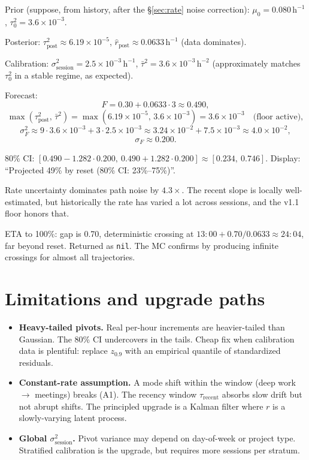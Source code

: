 \documentclass[11pt]{article}
\newcommand{\rpost}{\hat r_{\text{post}}}
\newcommand{\taupostsq}{\tau_{\text{post}}^2}
\newcommand{\tauzerosq}{\tau_0^2}
\newcommand{\sigsessionsq}{\sigma_{\text{session}}^2}
\newcommand{\taurecent}{\tau_{\text{recent}}}
\begin{document}
Prior (suppose, from history, after the \S\ref{sec:rate} noise correction):
$\mu_0 = 0.080\,\mathrm{h}^{-1}$, $\tauzerosq = 3.6 \times 10^{-3}$.

Posterior: $\taupostsq \approx 6.19 \times 10^{-5}$, $\rpost \approx
0.0633\,\mathrm{h}^{-1}$ (data dominates).

Calibration: $\sigsessionsq = 2.5 \times 10^{-3}\,\mathrm{h}^{-1}$, $\bar\tau^2
= 3.6 \times 10^{-3}\,\mathrm{h}^{-2}$ (approximately matches $\tauzerosq$ in a
stable regime, as expected).

Forecast:
\[
  F = 0.30 + 0.0633 \cdot 3 \approx 0.490,
\]
\[
  \max(\taupostsq,\, \bar\tau^2) = \max(6.19 \times 10^{-5},\, 3.6 \times 10^{-3})
    = 3.6 \times 10^{-3} \quad \text{(floor active)},
\]
\[
  \sigma_F^2 \approx 9 \cdot 3.6 \times 10^{-3}
    + 3 \cdot 2.5 \times 10^{-3}
    \approx 3.24 \times 10^{-2} + 7.5 \times 10^{-3}
    \approx 4.0 \times 10^{-2},
\]
\[
  \sigma_F \approx 0.200.
\]

80\% CI: $[0.490 - 1.282 \cdot 0.200,\ 0.490 + 1.282 \cdot 0.200]
\approx [0.234,\ 0.746]$. Display: ``Projected 49\% by reset (80\% CI:
23\%--75\%)''.

Rate uncertainty dominates path noise by $4.3\times$. The recent slope is
locally well-estimated, but historically the rate has varied a lot across
sessions, and the v1.1 floor honors that.

ETA to 100\%: gap is 0.70, deterministic crossing at $13{:}00 +
0.70/0.0633 \approx 24{:}04$, far beyond reset. Returned as \texttt{nil}.
The MC confirms by producing infinite crossings for almost all
trajectories.

\section{Limitations and upgrade paths}

\begin{itemize}
  \item \textbf{Heavy-tailed pivots.} Real per-hour increments are
    heavier-tailed than Gaussian. The 80\% CI undercovers in the tails.
    Cheap fix when calibration data is plentiful: replace $z_{0.9}$ with an
    empirical quantile of standardized residuals.
  \item \textbf{Constant-rate assumption.} A mode shift within the window
    (deep work $\to$ meetings) breaks (A1). The recency window $\taurecent$
    absorbs slow drift but not abrupt shifts. The principled upgrade is a
    Kalman filter where $r$ is a slowly-varying latent process.
  \item \textbf{Global $\sigsessionsq$.} Pivot variance may depend on
    day-of-week or project type. Stratified calibration is the upgrade, but
    requires more sessions per stratum.
\end{itemize}
\end{document}

